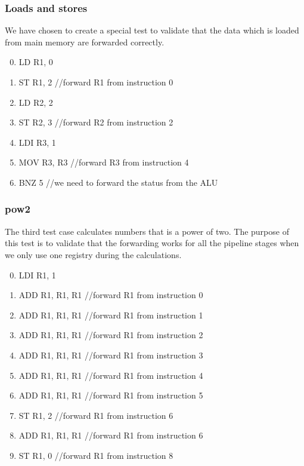 \documentclass[11pt]{article}
\begin{document}
\subsubsection*{Loads and stores}
We have chosen to create a special test to validate that the data
which is loaded from main memory are forwarded correctly.
\begin{enumerate}
\setcounter{enumi}{-1}
\item LD R1, 0
\item ST R1, 2 //forward R1 from instruction 0
\item LD R2, 2
\item ST R2, 3 //forward R2 from instruction 2
\item LDI R3, 1
\item MOV R3, R3 //forward R3 from instruction 4
\item BNZ 5 //we need to forward the status from the ALU
\end{enumerate}

\subsubsection*{pow2}
The third test case calculates numbers that is a power of two. The
purpose of this test is to validate that the forwarding works for all
the pipeline stages when we only use one registry during the
calculations.
\begin{enumerate}
\setcounter{enumi}{-1}
\item LDI R1, 1
\item ADD R1, R1, R1 //forward R1 from instruction 0
\item ADD R1, R1, R1 //forward R1 from instruction 1
\item ADD R1, R1, R1 //forward R1 from instruction 2
\item ADD R1, R1, R1 //forward R1 from instruction 3
\item ADD R1, R1, R1 //forward R1 from instruction 4
\item ADD R1, R1, R1 //forward R1 from instruction 5
\item ST R1, 2 //forward R1 from instruction 6
\item ADD R1, R1, R1 //forward R1 from instruction 6
\item ST R1, 0 //forward R1 from instruction 8
\end{enumerate}
\end{document}

